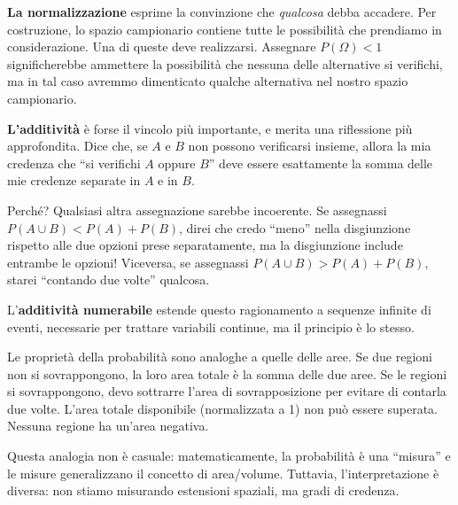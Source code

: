 \documentclass[
  italian,
  letterpaper,
  a4paper,
  11pt,
  open=any]{scrbook}
\theoremstyle{plain}
\theoremstyle{definition}
\theoremstyle{definition}
\theoremstyle{remark}
\begin{document}
\textbf{La normalizzazione} esprime la convinzione che \emph{qualcosa}
debba accadere. Per costruzione, lo spazio campionario contiene tutte le
possibilità che prendiamo in considerazione. Una di queste deve
realizzarsi. Assegnare \(P(\Omega) < 1\) significherebbe ammettere la
possibilità che nessuna delle alternative si verifichi, ma in tal caso
avremmo dimenticato qualche alternativa nel nostro spazio campionario.

\textbf{L'additività} è forse il vincolo più importante, e merita una
riflessione più approfondita. Dice che, se \(A\) e \(B\) non possono
verificarsi insieme, allora la mia credenza che ``si verifichi \(A\)
oppure \(B\)'' deve essere esattamente la somma delle mie credenze
separate in \(A\) e in \(B\).

Perché? Qualsiasi altra assegnazione sarebbe incoerente. Se assegnassi
\(P(A \cup B) < P(A) + P(B)\), direi che credo ``meno'' nella
disgiunzione rispetto alle due opzioni prese separatamente, ma la
disgiunzione include entrambe le opzioni! Viceversa, se assegnassi
\(P(A \cup B) > P(A) + P(B)\), starei ``contando due volte'' qualcosa.

L'\textbf{additività numerabile} estende questo ragionamento a sequenze
infinite di eventi, necessarie per trattare variabili continue, ma il
principio è lo stesso.

\begin{tcolorbox}[enhanced jigsaw, arc=.35mm, bottomrule=.15mm, bottomtitle=1mm, breakable, colback=white, colbacktitle=quarto-callout-note-color!10!white, colframe=quarto-callout-note-color-frame, coltitle=black, left=2mm, leftrule=.75mm, opacityback=0, opacitybacktitle=0.6, rightrule=.15mm, title=\textcolor{quarto-callout-note-color}{\faInfo}\hspace{0.5em}{Un'analogia utile: le aree}, titlerule=0mm, toprule=.15mm, toptitle=1mm]

Le proprietà della probabilità sono analoghe a quelle delle aree. Se due
regioni non si sovrappongono, la loro area totale è la somma delle due
aree. Se le regioni si sovrappongono, devo sottrarre l'area di
sovrapposizione per evitare di contarla due volte. L'area totale
disponibile (normalizzata a 1) non può essere superata. Nessuna regione
ha un'area negativa.

Questa analogia non è casuale: matematicamente, la probabilità è una
``misura'' e le misure generalizzano il concetto di area/volume.
Tuttavia, l'interpretazione è diversa: non stiamo misurando estensioni
spaziali, ma gradi di credenza.

\end{tcolorbox}
\end{document}
